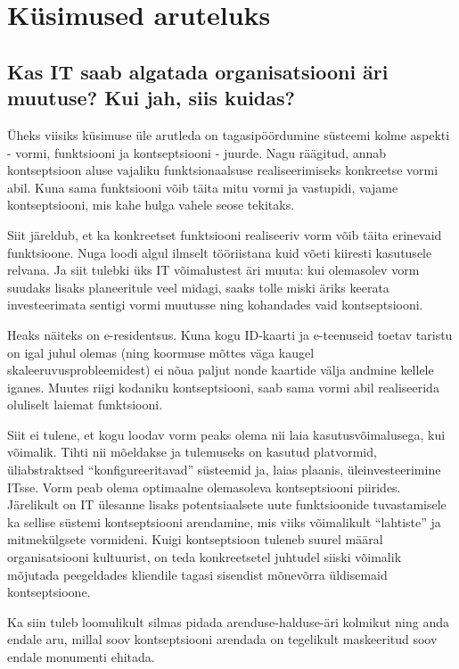 \section{Küsimused aruteluks}
\subsection{Kas IT saab algatada organisatsiooni äri muutuse? Kui jah, siis kuidas?}
Üheks viisiks küsimuse üle arutleda on tagasipöördumine süsteemi kolme aspekti - vormi, funktsiooni ja kontseptsiooni - juurde. Nagu räägitud, annab kontseptsioon aluse vajaliku funktsionaalsuse realiseerimiseks konkreetse vormi abil. Kuna sama funktsiooni võib täita mitu vormi ja vastupidi, vajame kontseptsiooni, mis kahe hulga vahele seose tekitaks. 

Siit järeldub, et ka konkreetset funktsiooni realiseeriv vorm võib täita erinevaid funktsioone. Nuga loodi algul ilmselt tööriistana kuid võeti kiiresti kasutusele relvana. Ja siit tulebki üks IT võimalustest äri muuta: kui olemasolev vorm suudaks lisaks planeeritule veel midagi, saaks tolle miski äriks keerata investeerimata sentigi vormi muutusse ning kohandades vaid kontseptsiooni. 

Heaks näiteks on e-residentsus. Kuna kogu ID-kaarti ja e-teenuseid toetav taristu on igal juhul olemas (ning koormuse mõttes väga kaugel skaleeruvusprobleemidest) ei nõua paljut nonde kaartide välja andmine kellele iganes. Muutes riigi kodaniku kontseptsiooni, saab sama vormi abil realiseerida oluliselt laiemat funktsiooni. 

Siit ei tulene, et kogu loodav vorm peaks olema nii laia kasutusvõimalusega, kui võimalik. Tihti nii mõeldakse ja tulemuseks on kasutud platvormid, üliabstraktsed \enquote{konfigureeritavad} süsteemid ja, laias plaanis, üleinvesteerimine ITsse. Vorm peab olema optimaalne olemasoleva kontseptsiooni piirides. Järelikult on IT ülesanne lisaks potentsiaalsete uute funktsioonide tuvastamisele ka sellise süstemi kontseptsiooni arendamine, mis viiks võimalikult \enquote{lahtiste} ja mitmekülgsete vormideni. Kuigi kontseptsioon tuleneb suurel määral organisatsiooni kultuurist, on teda konkreetsetel juhtudel siiski võimalik mõjutada peegeldades kliendile tagasi sisendist mõnevõrra üldisemaid kontseptsioone. 

Ka siin tuleb loomulikult silmas pidada arenduse-halduse-äri kolmikut ning anda endale aru, millal soov kontseptsiooni arendada on tegelikult maskeeritud soov endale monumenti ehitada.

